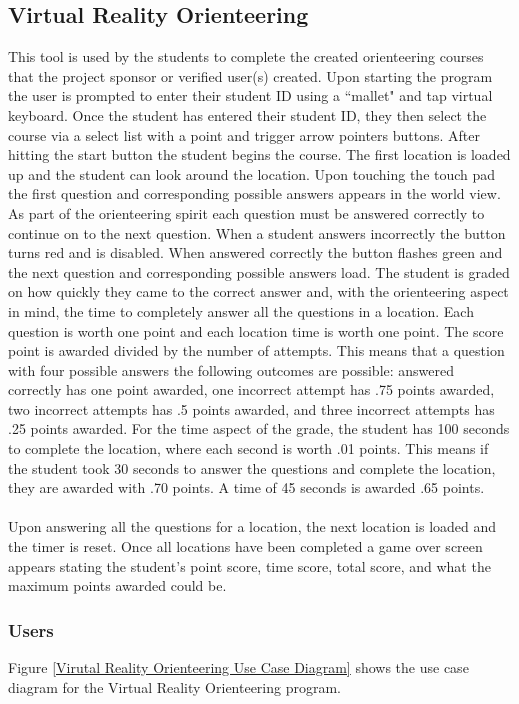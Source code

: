 \subsection{Virtual Reality Orienteering}
This tool is used by the students to complete the created orienteering courses that the project sponsor or verified user(s) created. Upon starting the program the user is prompted to enter their student ID using a ``mallet" and tap virtual keyboard. Once the student has entered their student ID, they then select the course via a select list with a point and trigger arrow pointers buttons. After hitting the start button the student begins the course. The first location is loaded up and the student can look around the location. Upon touching the touch pad the first question and corresponding possible answers appears in the world view. As part of the orienteering spirit each question must be answered correctly to continue on to the next question. When a student answers incorrectly the button turns red and is disabled. When answered correctly the button flashes green and the next question and corresponding possible answers load. The student is graded on how quickly they came to the correct answer and, with the orienteering aspect in mind, the time to completely answer all the questions in a location. Each question is worth one point and each location time is worth one point. The score point is awarded divided by the number of attempts. This means that a question with four possible answers the following outcomes are possible: answered correctly has one point awarded, one incorrect attempt has .75 points awarded, two incorrect attempts has .5 points awarded, and three incorrect attempts has .25 points awarded. For the time aspect of the grade, the student has 100 seconds to complete the location, where each second is worth .01 points. This means if the student took 30 seconds to answer the questions and complete the location, they are awarded with .70 points. A time of 45 seconds is awarded .65 points. \\
\\
Upon answering all the questions for a location, the next location is loaded and the timer is reset. Once all locations have been completed a game over screen appears stating the student's point score, time score, total score, and what the maximum points awarded could be. 
\subsubsection{Users}
Figure \ref{Virutal Reality Orienteering Use Case Diagram} shows the use case diagram for the Virtual Reality Orienteering program.

